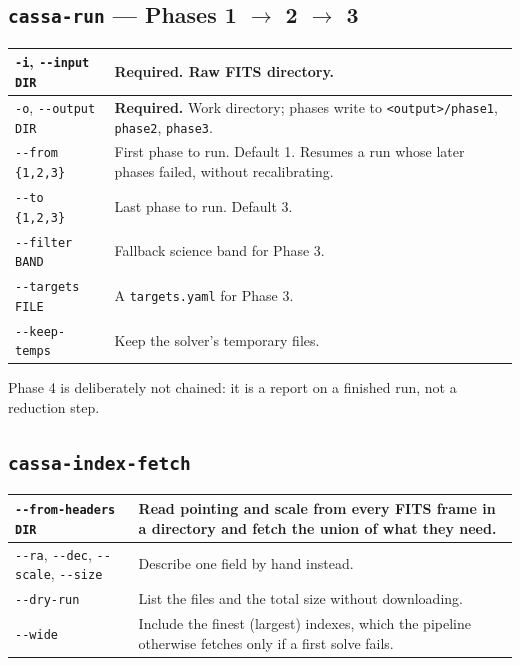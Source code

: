 \documentclass[11pt,a4paper]{article}
\begin{document}
\subsection{\texttt{cassa-run} --- Phases 1 $\rightarrow$ 2 $\rightarrow$ 3}
\begin{center}
\begin{tabularx}{\textwidth}{|l|X|}
\hline
\texttt{-i}, \texttt{-{}-input DIR} & \textbf{Required.} Raw FITS directory. \\
\hline
\texttt{-o}, \texttt{-{}-output DIR} & \textbf{Required.} Work directory; phases write to \texttt{<output>/phase1}, \texttt{phase2}, \texttt{phase3}. \\
\hline
\texttt{-{}-from \{1,2,3\}} & First phase to run. Default 1. Resumes a run whose later phases failed, without recalibrating. \\
\hline
\texttt{-{}-to \{1,2,3\}} & Last phase to run. Default 3. \\
\hline
\texttt{-{}-filter BAND} & Fallback science band for Phase 3. \\
\hline
\texttt{-{}-targets FILE} & A \texttt{targets.yaml} for Phase 3. \\
\hline
\texttt{-{}-keep-temps} & Keep the solver's temporary files. \\
\hline
\end{tabularx}
\end{center}

Phase 4 is deliberately not chained: it is a report on a finished run, not a
reduction step.

\subsection{\texttt{cassa-index-fetch}}
\begin{center}
\begin{tabularx}{\textwidth}{|l|X|}
\hline
\texttt{-{}-from-headers DIR} & Read pointing and scale from every FITS frame in a directory and fetch the union of what they need. \\
\hline
\texttt{-{}-ra}, \texttt{-{}-dec}, \texttt{-{}-scale}, \texttt{-{}-size} & Describe one field by hand instead. \\
\hline
\texttt{-{}-dry-run} & List the files and the total size without downloading. \\
\hline
\texttt{-{}-wide} & Include the finest (largest) indexes, which the pipeline otherwise fetches only if a first solve fails. \\
\hline
\end{tabularx}
\end{center}
\end{document}
